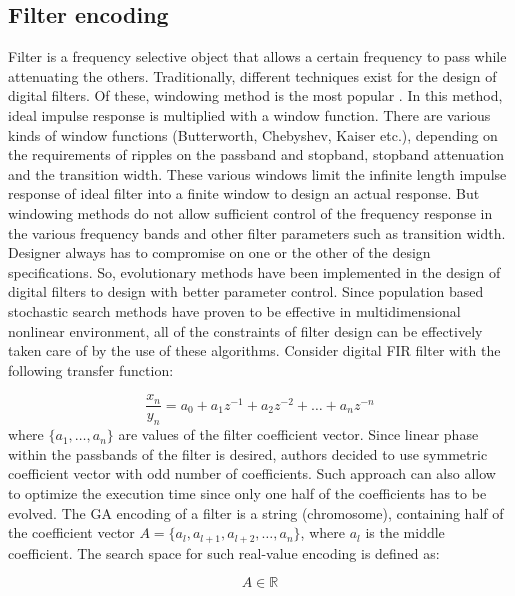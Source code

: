 \documentclass[preprint,12pt]{elsarticle}
\begin{document}
\subsection{Filter encoding}

Filter is a frequency selective object that allows a certain frequency to pass while attenuating the others. Traditionally, different techniques exist for the design of digital filters. Of these, windowing method is the most popular \cite{oppenheim1999discrete}. In this method, ideal impulse response is multiplied with a window function. There are various kinds of window functions (Butterworth, Chebyshev, Kaiser etc.), depending on the requirements of ripples on the passband and stopband, stopband attenuation and the transition width. These various windows limit the infinite length impulse response of ideal filter into a finite window to design an actual response. But windowing methods do not allow sufficient control of the frequency response in the various frequency bands and other filter parameters such as transition width. Designer always has to compromise on one or the other of the design specifications. So, evolutionary methods have been implemented in the design of digital filters to design with better parameter control. Since population based stochastic search methods have proven to be effective in multidimensional nonlinear environment, all of the constraints of filter design can be effectively taken care of by the use of these algorithms. 
Consider digital FIR filter with the following transfer function:

\begin{equation}
\label{eq:fir}
\frac{x_n}{y_n}=a_0 + a_1 z^{-1} + a_2 z^{-2} +\dots +a_n z^{-n}
\end{equation}
where $\{a_1,\dots ,a_n \}$ are values of the filter coefficient vector. Since linear phase within the passbands of the filter is desired, authors decided to use symmetric coefficient vector with odd number of coefficients. Such approach can also allow to optimize the execution time since only one half of the coefficients has to be evolved. The GA encoding of a filter is a string (chromosome), containing half of the coefficient vector $A=\{a_l,a_{l+1},a_{l+2},\dots,a_n\}$, where $a_l$ is the middle coefficient. The search space for such real-value encoding is defined as:

\begin{equation}
\label{eq:ar}
A\in \mathbb{R}
\end{equation}
\end{document}
